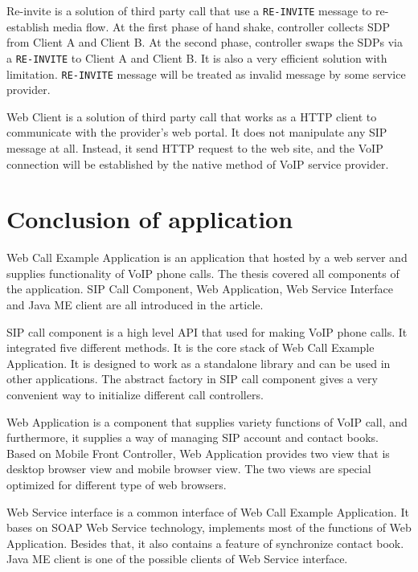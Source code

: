 \textsf{Re-invite} is a solution of third party call that use a \texttt{RE-INVITE} message to re-establish media flow. At the first phase of hand shake, controller collects SDP from Client A and Client B. At the second phase, controller swaps the SDPs via a \texttt{RE-INVITE} to Client A and Client B. It is also a very efficient solution with limitation. \texttt{RE-INVITE} message will be treated as invalid message by some service provider.

\textsf{Web Client} is a solution of third party call that works as a HTTP client to communicate with the provider's web portal. It does not manipulate any SIP message at all. Instead, it send HTTP request to the web site, and the VoIP connection will be established by the native method of VoIP service provider.

\section{Conclusion of application}

Web Call Example Application is an application that hosted by a web server and supplies functionality of VoIP phone calls. The thesis covered all components of the application. \textsf{SIP Call Component}, \textsf{Web Application}, \textsf{Web Service Interface} and \textsf{Java ME client} are all introduced in the article. 

\textsf{SIP call component} is a high level API that used for making VoIP phone calls. It integrated five different methods. It is the core stack of \textsf{Web Call Example Application}. It is designed to work as a standalone library and can be used in other applications. The abstract factory in SIP call component gives a very convenient way to initialize different call controllers.

\textsf{Web Application} is a component that supplies variety functions of VoIP call, and furthermore, it supplies a way of managing SIP account and contact books. Based on Mobile Front Controller, Web Application provides two view that is desktop browser view and mobile browser view. The two views are special optimized for different type of web browsers.

\textsf{Web Service interface} is a common interface of Web Call Example Application. It bases on SOAP Web Service technology, implements most of the functions of Web Application. Besides that, it also contains a feature of synchronize contact book. Java ME client is one of the possible clients of Web Service interface.

